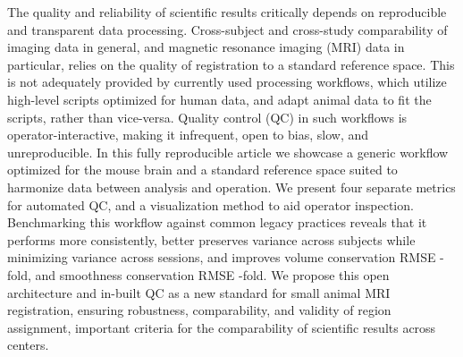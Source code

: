 The quality and reliability of scientific results critically depends on reproducible and transparent data processing.
Cross-subject and cross-study comparability of imaging data in general, and magnetic resonance imaging (MRI) data in particular, relies on the quality of registration to a standard reference space.
This is not adequately provided by currently used processing workflows, which utilize high-level scripts optimized for human data, and adapt animal data to fit the scripts, rather than vice-versa.
Quality control (QC) in such workflows is operator-interactive, making it infrequent, open to bias, slow, and unreproducible.
In this fully reproducible article we showcase a generic workflow optimized for the mouse brain and a standard reference space suited to harmonize data between analysis and operation.
We present four separate metrics for automated QC, and a visualization method to aid operator inspection.
Benchmarking this workflow against common legacy practices reveals that it performs more consistently, better preserves variance across subjects while minimizing variance across sessions, and improves volume conservation RMSE
-fold,
and smoothness conservation RMSE
-fold.
We propose this open architecture and in-built QC as a new standard for small animal MRI registration, ensuring robustness, comparability, and validity of region assignment, important criteria for the comparability of scientific results across centers.
